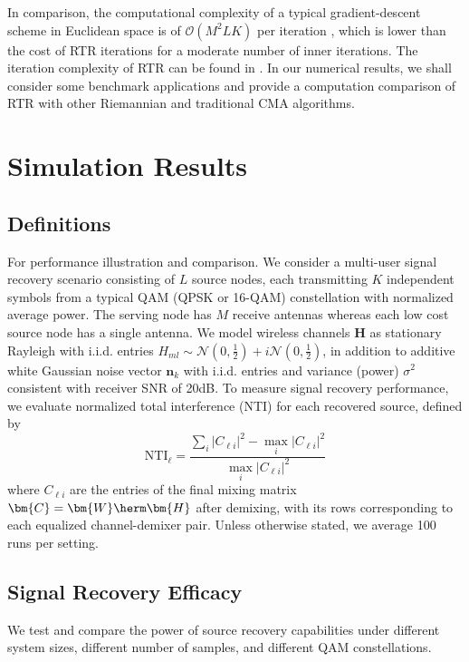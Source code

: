 In comparison, the computational complexity of a typical gradient-descent scheme in Euclidean space is
of $\mathcal{O}(M^2LK)$ per iteration \cite{Feres2019wfcma}, 
which is lower than the cost of RTR iterations for a moderate number of inner iterations.
The iteration complexity of RTR can be found in \cite[Theorem 6.10]{boumal2020intromanifolds}. 
In our numerical results, 
we shall consider some benchmark
applications and provide a computation 
comparison of RTR with other Riemannian and traditional 
CMA algorithms. 



\section{Simulation Results} \label{rocma:Simulations}
\subsection{Definitions} \label{rocma:sim:definitions}

For performance illustration and
comparison. We consider a multi-user 
signal recovery scenario consisting
of $L$ source nodes, each 
transmitting $K$ independent symbols from a typical QAM (QPSK or 16-QAM) constellation 
with normalized average power.
The serving node has $M$ receive antennas whereas each low cost source node 
has a single antenna. We model
wireless channels $\bm{H}$ as stationary Rayleigh with i.i.d. entries $H_{ml}\sim\mathcal{N}(0,\frac{1}{2})+i\mathcal{N}(0,\frac{1}{2})$, 
in addition to additive white Gaussian noise vector
$\bm{n}_k$ with i.i.d. entries
and variance (power) $\sigma^2$ consistent
with receiver SNR of 20dB.  
To measure signal recovery
performance, we evaluate normalized total interference (NTI) for each recovered source, defined by
\begin{equation}
	\mathrm{NTI}_{\ell}=\frac{\sum_i |C_{\ell i}|^2- \max_i |C_{\ell i}|^2}{\max_i |C_{\ell i}|^2} \label{rocma:eqn:totalinterference}
\end{equation}
where $C_{\ell i}$ are the
entries of the final mixing matrix
$\bm{C} = \bm{W}\herm\bm{H}$ 
after demixing, with its rows corresponding to each equalized channel-demixer pair.
Unless otherwise stated, we average 100 runs per setting. 




\subsection{Signal Recovery Efficacy}\label{rocma:sim:recovery}
We test and compare the power of 
source recovery capabilities 
under different system sizes, different number of samples, and different QAM 
constellations. 

